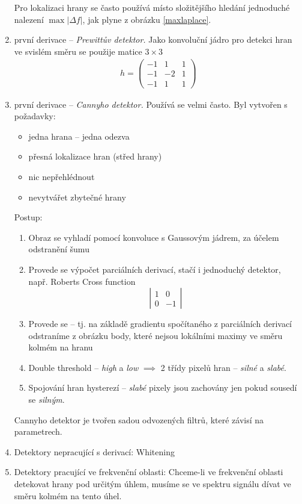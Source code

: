 \begin{enumerate}
Pro lokalizaci hrany se často používá místo složitějšího hledání  jednoduché nalezení $\max|\Delta f|$, 
jak plyne z obrázku \ref{maxlaplace}.
\item první derivace -- \emph{Prewittův detektor.}
Jako konvoluční jádro pro detekci hran ve svislém směru se použije matice $3\times3$
\begin{align}
h =\left(\begin{array}{ccc}-1&1&1\\-1&-2&1\\-1&1&1\end{array}\right)
\end{align}

\item první derivace -- \emph{Cannyho detektor.} Používá se velmi často. Byl vytvořen s požadavky:
\begin{itemize} 
\item jedna hrana -- jedna odezva
\item přesná lokalizace hran (střed hrany)
\item nic nepřehlédnout
\item nevytvářet zbytečné hrany
\end{itemize}

Postup:

\begin{enumerate} 
\item Obraz se vyhladí pomocí konvoluce s Gaussovým jádrem, za účelem odstranění šumu
\item Provede se výpočet parciálních derivací, stačí i jednoduchý detektor, např. Roberts Cross function
$$\left|\begin{array}{cc}1&0\\0&-1\end{array}\right|$$
\item Provede se  -- tj. na základě gradientu spočítaného z parciálních derivací odstraníme
z obrázku body, které nejsou lokálními maximy ve směru kolmém na hranu
\item Double threshold -- \emph{high} a \emph{low} $ \implies $ 2 třídy pixelů hran -- \emph{silné} a \emph{slabé}.
\item Spojování hran hysterezí -- \emph{slabé} pixely jsou zachovány jen pokud sousedí se \emph{silným}.
\end{enumerate}

Cannyho detektor je tvořen sadou odvozených filtrů, které závisí na parametrech.

\item Detektory nepracující s derivací: Whitening

\item Detektory pracující ve frekvenční oblasti: Chceme-li ve frekvenční oblasti detekovat hrany pod určitým úhlem, musíme se ve spektru signálu dívat ve směru kolmém na tento úhel.

\end{enumerate}


